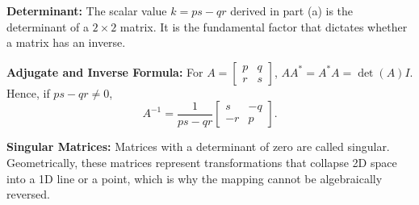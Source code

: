 \begin{takeaways}
\item \textbf{Determinant:} The scalar value $k = ps - qr$ derived in part (a) is the determinant of a $2 \times 2$ matrix. It is the fundamental factor that dictates whether a matrix has an inverse.
\item \textbf{Adjugate and Inverse Formula:} For $A=\begin{bmatrix}p&q\\r&s\end{bmatrix}$,
$AA^*=A^*A=\det(A)I$. Hence, if $ps-qr\neq0$,
\[
A^{-1}=\frac{1}{ps-qr}\begin{bmatrix}s&-q\\-r&p\end{bmatrix}.
\]
\item \textbf{Singular Matrices:} Matrices with a determinant of zero are called singular. Geometrically, these matrices represent transformations that collapse 2D space into a 1D line or a point, which is why the mapping cannot be algebraically reversed.
\end{takeaways}


